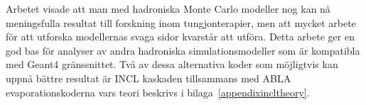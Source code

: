 Arbetet visade att man med hadroniska Monte Carlo modeller nog kan nå meningsfulla resultat till forskning inom tungjonterapier, men att mycket arbete för att utforska modellernas svaga sidor kvarstår att utföra. Detta arbete ger en god bas för analyser av andra hadroniska simulationsmodeller som är kompatibla med Geant4 gränssnittet. Två av dessa alternativa koder som möjligtvis kan uppnå bättre resultat är INCL kaskaden tillsammans med ABLA evaporationskoderna vars teori beskrivs i bilaga~\ref{appendixincltheory}.




